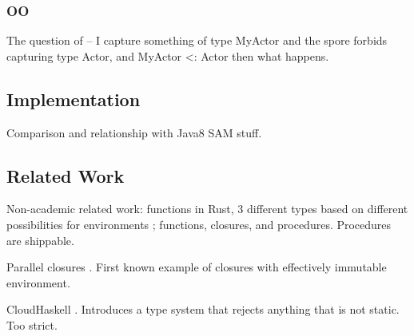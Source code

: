\documentclass{llncs}
\begin{document}
\subsubsection{OO}

The question of -- I capture something of type MyActor
and the spore forbids capturing type Actor, and MyActor <: Actor
then what happens.

\subsection{Implementation}

Comparison and relationship with Java8 SAM stuff.

\subsection{Related Work}

Non-academic related work: functions in Rust, 3 different types based on
different possibilities for environments \cite{RustFunctions}; functions,
closures, and procedures. Procedures are shippable.

Parallel closures \cite{ParallelClosures}. First known example of closures
with effectively immutable environment.

CloudHaskell \cite{CloudHaskell}. Introduces a type system that rejects anything
that is not static. Too strict.




\end{document}

